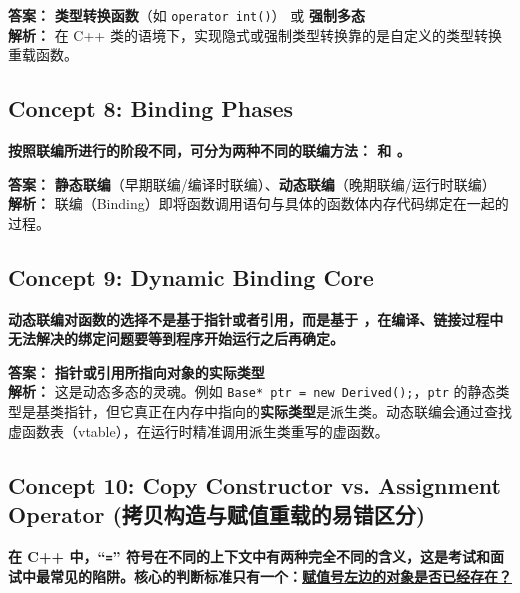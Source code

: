 \documentclass[11pt, a4paper]{article}
\begin{document}
\vspace{0.5em}
\noindent \textbf{答案：} \textbf{类型转换函数}（如 \texttt{operator int()}） 或 \textbf{强制多态} \\
\textbf{解析：} 在 C++ 类的语境下，实现隐式或强制类型转换靠的是自定义的类型转换重载函数。

\subsection*{Concept 8: Binding Phases}
\textbf{按照联编所进行的阶段不同，可分为两种不同的联编方法：\underline{\hspace{3cm}} 和 \underline{\hspace{3cm}}。}

\vspace{0.5em}
\noindent \textbf{答案：} \textbf{静态联编}（早期联编/编译时联编）、\textbf{动态联编}（晚期联编/运行时联编）\\
\textbf{解析：} 联编（Binding）即将函数调用语句与具体的函数体内存代码绑定在一起的过程。

\subsection*{Concept 9: Dynamic Binding Core}
\textbf{动态联编对函数的选择不是基于指针或者引用，而是基于 \underline{\hspace{4cm}} ，在编译、链接过程中无法解决的绑定问题要等到程序开始运行之后再确定。}

\vspace{0.5em}
\noindent \textbf{答案：} \textbf{指针或引用所指向对象的实际类型} \\
\textbf{解析：} 这是动态多态的灵魂。例如 \texttt{Base* ptr = new Derived();}，\texttt{ptr} 的静态类型是基类指针，但它真正在内存中指向的\textbf{实际类型}是派生类。动态联编会通过查找虚函数表（vtable），在运行时精准调用派生类重写的虚函数。

\subsection*{Concept 10: Copy Constructor vs. Assignment Operator (拷贝构造与赋值重载的易错区分)}
\textbf{在 C++ 中，“\texttt{=}” 符号在不同的上下文中有两种完全不同的含义，这是考试和面试中最常见的陷阱。核心的判断标准只有一个：\underline{赋值号左边的对象是否已经存在？}}
\end{document}
